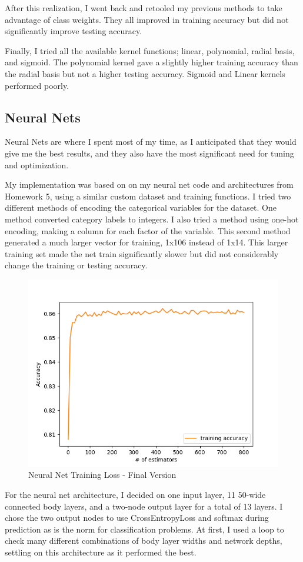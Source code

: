 \documentclass{article}
\begin{document}
After this realization, I went back and retooled my previous methods to take advantage of class weights. They all improved in training accuracy but did not significantly improve testing accuracy. 

Finally, I tried all the available kernel functions; linear, polynomial, radial basis, and sigmoid. The polynomial kernel gave a slightly higher training accuracy than the radial basis but not a higher testing accuracy. Sigmoid and Linear kernels performed poorly. 

\subsection{Neural Nets}

Neural Nets are where I spent most of my time, as I anticipated that they would give me the best results, and they also have the most significant need for tuning and optimization. 

My implementation was based on on my neural net code and architectures from Homework 5, using a similar custom dataset and training functions. I tried two different methods of encoding the categorical variables for the dataset. One method converted category labels to integers. I also tried a method using one-hot encoding, making a column for each factor of the variable. This second method generated a much larger vector for training, 1x106 instead of 1x14. This larger training set made the net train significantly slower but did not considerably change the training or testing accuracy.

\begin{figure}[h]
    \centering
    \includegraphics[width=0.6\linewidth]{img/rf_acc.png}
    \caption{Neural Net Training Loss - Final Version}
    \label{fig:nn}
\end{figure}

For the neural net architecture, I decided on one input layer, 11 50-wide connected body layers, and a two-node output layer for a total of 13 layers. I chose the two output nodes to use CrossEntropyLoss and softmax during prediction as is the norm for classification problems. At first, I used a loop to check many different combinations of body layer widths and network depths, settling on this architecture as it performed the best. 
\end{document}
